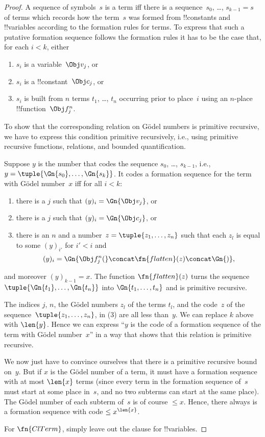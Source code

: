 \documentclass[../../../include/open-logic-section]{subfiles}
\begin{document}
\begin{proof}
A sequence of symbols~$s$ is a term iff there is a sequence~$s_0$,
\dots, $s_{k-1} = s$ of terms which records how the term~$s$ was formed
from !!{constant}s and !!{variable}s according to the formation rules
for terms. To express that such a putative formation sequence follows
the formation rules it has to be the case that, for each $i < k$, either
\begin{enumerate}
\item $s_i$ is a variable~$\Obj v_j$, or
\item $s_i$ is a !!{constant}~$\Obj c_j$, or
\item $s_i$ is built from $n$ terms $t_1$, \dots, $t_n$ occurring
  prior to place~$i$ using an $n$-place !!{function}~$\Obj f^n_j$.
\end{enumerate}
To show that the corresponding relation on G\"odel numbers is
primitive recursive, we have to express this condition primitive
recursively, i.e., using primitive recursive functions, relations, and
bounded quantification.

Suppose $y$ is the number that codes the sequence $s_0$, \dots, $s_{k-1}$,
i.e., $y = \tuple{\Gn{s_0}, \dots, \Gn{s_k}}$.  It codes a formation
sequence for the term with G\"odel number~$x$ iff for all $i < k$:
\begin{enumerate}
\item there is a $j$ such that $(y)_i = \Gn{\Obj v_j}$, or
\item there is a $j$ such that $(y)_i = \Gn{\Obj c_j}$, or
\item there is an $n$ and a number~$z = \tuple{z_1, \dots, z_n}$ such
  that each $z_l$ is equal to some $(y)_{i'}$ for $i' < i$ and
\[
(y)_i = \Gn{\Obj f^n_j(} \concat \fn{flatten}(z) \concat \Gn{)},
\]
\end{enumerate}
and moreover $(y)_{k-1} = x$.  The function $\fn{flatten}(z)$ turns
the sequence $\tuple{\Gn{t_1}, \dots, \Gn{t_n}}$ into $\Gn{t_1, \dots,
  t_n}$ and is primitive recursive.

The indices $j$, $n$, the G\"odel numbers $z_l$ of the terms $t_l$,
and the code~$z$ of the sequence~$\tuple{z_1, \dots, z_n}$, in (3) are
all less than~$y$.  We can replace $k$ above with $\len{y}$.  Hence we
can express ``$y$ is the code of a formation sequence of the term with
G\"odel number~$x$'' in a way that shows that this relation is
primitive recursive.

We now just have to convince ourselves that there is a primitive
recursive bound on~$y$.  But if $x$ is the G\"odel number of a term,
it must have a formation sequence with at most $\len{x}$ terms (since
every term in the formation sequence of~$s$ must start at some place
in~$s$, and no two subterms can start at the same place).  The G\"odel
number of each subterm of~$s$ is of course $\le x$.  Hence, there
always is a formation sequence with code $\le x^{\len{x}}$.

For $\fn{ClTerm}$, simply leave out the clause for !!{variable}s.
\end{proof}
\end{document}
